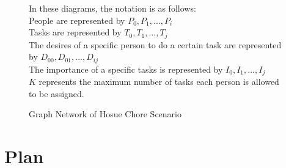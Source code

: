 \documentclass{article}
\newcommand\tab[1][1cm]{\hspace*{#1}}
\begin{document}
\begin{figure}[ht!]
  \caption{Graph Network of Hosue Chore Scenario}
In these diagrams, the notation is as follows: \\
\tab People are represented by $P_0, P_1, ..., P_i$ \\
\tab Tasks are represented by $T_0, T_1, ..., T_j$ \\
\tab The desires of a specific person to do a certain task are represented by $D_{00}, D_{01}, ..., D_{ij}$ \\
\tab The importance of a specific tasks is represented by $I_0, I_1, ..., I_j$ \\
\tab $K$ represents the maximum number of tasks each person is allowed to be assigned.
\end{figure}

\section*{Plan}
\lipsum[4-4]
\end{document}
